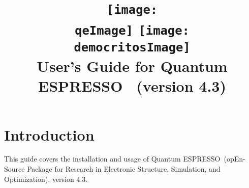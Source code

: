 \documentclass[12pt,a4paper]{article}
\def\version{4.3}
\def\qe{{\sc Quantum ESPRESSO}}
\begin{document}
 
\author{}
\date{}

\def\qeImage{quantum_espresso.pdf}
\def\democritosImage{democritos.pdf}

\begin{htmlonly}
\def\qeImage{quantum_espresso.png}
\def\democritosImage{democritos.png}
\end{htmlonly}

\title{
  \texttt{[image: \\qeImage]} \hskip 2cm
  \texttt{[image: \\democritosImage]}\\
  \vskip 1cm
  \Huge User's Guide for \qe\ \smallskip
  \Large (version \version)
}


\maketitle

\tableofcontents

\section{Introduction}

This guide covers the installation and usage of \qe\ (opEn-Source 
Package for Research in Electronic Structure, Simulation,
and Optimization), version \version.
\end{document}
